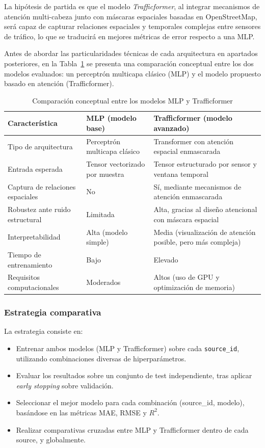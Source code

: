 La hipótesis de partida es que el modelo \textit{Trafficformer}, al integrar mecanismos de atención multi-cabeza junto con máscaras espaciales basadas en OpenStreetMap, será capaz de capturar relaciones espaciales y temporales complejas entre sensores de tráfico, lo que se traducirá en mejores métricas de error respecto a una MLP.

Antes de abordar las particularidades técnicas de cada arquitectura en apartados posteriores, en la Tabla~\ref{tab:mlp_vs_trafficformer} se presenta una comparación conceptual entre los dos modelos evaluados: un perceptrón multicapa clásico (MLP) y el modelo propuesto basado en atención (Trafficformer).

\begin{table}[H]
	\centering
	\caption{Comparación conceptual entre los modelos MLP y Trafficformer}
	\label{tab:mlp_vs_trafficformer}
	\begin{tabularx}{\textwidth}{lXX}
		\toprule
		\textbf{Característica} & \textbf{MLP (modelo base)} & \textbf{Trafficformer (modelo avanzado)} \\
		\midrule
		Tipo de arquitectura & Perceptrón multicapa clásico & Transformer con atención espacial enmascarada \\
		Entrada esperada & Tensor vectorizado por muestra & Tensor estructurado por sensor y ventana temporal \\
		Captura de relaciones espaciales & No & Sí, mediante mecanismos de atención enmascarada \\
		Robustez ante ruido estructural & Limitada & Alta, gracias al diseño atencional con máscara espacial \\
		Interpretabilidad & Alta (modelo simple) & Media (visualización de atención posible, pero más compleja) \\
		Tiempo de entrenamiento & Bajo & Elevado \\
		Requisitos computacionales & Moderados & Altos (uso de GPU y optimización de memoria) \\
		\bottomrule
	\end{tabularx}
\end{table}

\subsubsection*{Estrategia comparativa}

La estrategia consiste en:

\begin{itemize}
	\item Entrenar ambos modelos (MLP y Trafficformer) sobre cada \texttt{source\_id}, utilizando combinaciones diversas de hiperparámetros.
	\item Evaluar los resultados sobre un conjunto de test independiente, tras aplicar \textit{early stopping} sobre validación.
	\item Seleccionar el mejor modelo para cada combinación (source\_id, modelo), basándose en las métricas MAE, RMSE y $R^2$.
	\item Realizar comparativas cruzadas entre MLP y Trafficformer dentro de cada source, y globalmente.
\end{itemize}

